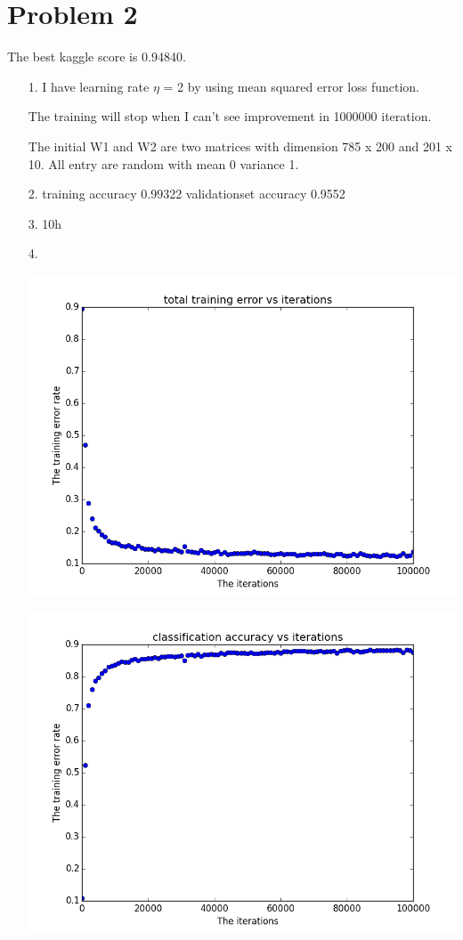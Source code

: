 \documentclass[11pt]{article}
\begin{document}
\section*{Problem 2}
The best kaggle score is 0.94840.

\begin{itemize}
\item[1.]
I have learning rate $\eta$ = 2 by using mean squared error loss function.

The training will stop when I can't see improvement in 1000000 iteration.

The initial W1 and W2 are two matrices with dimension 785 x 200 and 201 x 10. All entry are random with mean 0 variance 1.

\item[2.]
training accuracy 0.99322
validationset accuracy 0.9552

\item[3.]
10h

\item[4.]

\includegraphics[scale = 0.5]{4.png}

\includegraphics[scale = 0.5]{5.png}


\end{itemize}
\end{document}
